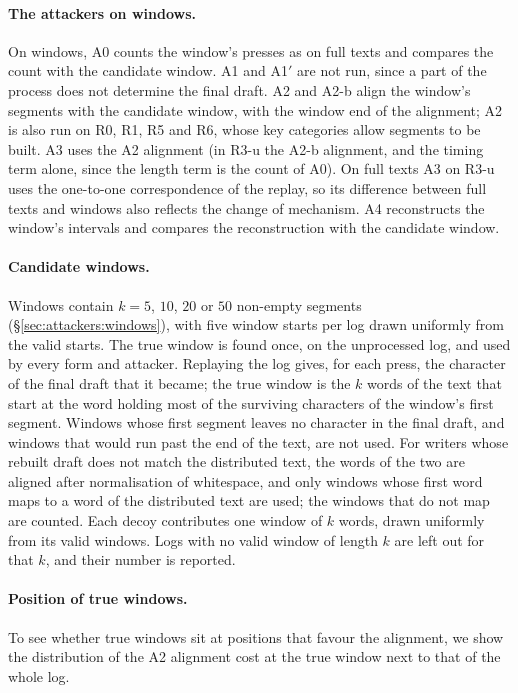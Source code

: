 \paragraph{The attackers on windows.}
On windows, A0 counts the window's presses as on full texts and compares the count with the candidate window. A1 and
A1$'$ are not run, since a part of the process does not determine the final draft. A2 and A2-b align the window's
segments with the candidate window, with the window end of the alignment; A2 is also run on R0, R1, R5 and R6, whose
key categories allow segments to be built. A3 uses the A2 alignment (in R3-u the A2-b alignment, and the timing term
alone, since the length term is the count of A0). On full texts A3 on R3-u uses the one-to-one correspondence of the
replay, so its difference between full texts and windows also reflects the change of mechanism. A4 reconstructs the
window's intervals and compares the reconstruction with the candidate window.

\paragraph{Candidate windows.}
Windows contain $k = 5$, $10$, $20$ or $50$ non-empty segments (\S\ref{sec:attackers:windows}), with five window starts
per log drawn uniformly from the valid starts. The true window is found once, on the unprocessed log, and used by
every form and attacker. Replaying the log gives, for each press, the character of the final draft that it became; the
true window is the $k$ words of the text that start at the word holding most of the surviving characters of the
window's first segment. Windows whose first segment leaves no character in the final draft, and windows that would run
past the end of the text, are not used. For writers whose rebuilt draft does not match the distributed text, the words
of the two are aligned after normalisation of whitespace, and only windows whose first word maps to a word of the
distributed text are used; the windows that do not map are counted. Each decoy contributes one window of $k$ words,
drawn uniformly from its valid windows. Logs with no valid window of length $k$ are left out for that $k$, and their
number is reported.

\paragraph{Position of true windows.}
To see whether true windows sit at positions that favour the alignment, we show the distribution of the A2 alignment
cost at the true window next to that of the whole log.
